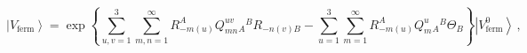 \begin{equation}\label{fermexp}
\left|V_{\mbox{ferm}}\right>=\exp\left\{\sum_{u,v=1}^3\sum_{m,n=1}^\infty
R_{-m(u)}^AQ^{uv}_{mn}{}_A{}^BR_{-n(v)B}-\sum_{u=1}^3\sum_{m=1}^\infty R^A_{-m(u)}Q^u_m{}_A{}^B\Theta_B
\right\}\left|V^0_{\mbox{ferm}}\right>\,,
\end{equation}

